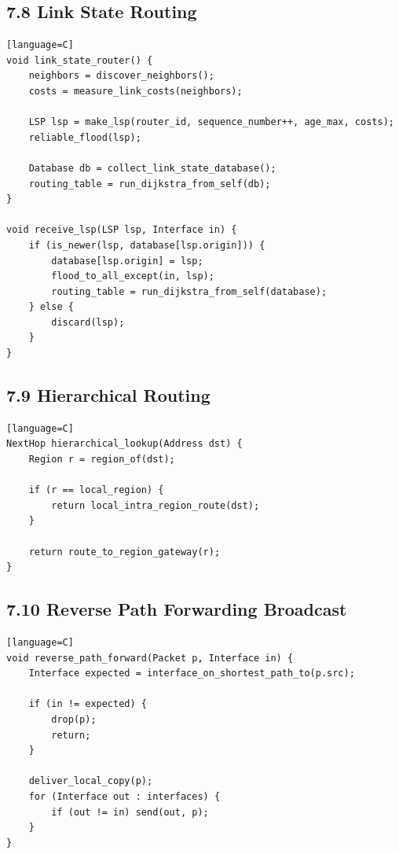 \documentclass[11pt]{article}
\begin{document}
\subsection{7.8 Link State Routing}\label{link-state-routing}

\begin{verbatim}[language=C]
void link_state_router() {
    neighbors = discover_neighbors();
    costs = measure_link_costs(neighbors);

    LSP lsp = make_lsp(router_id, sequence_number++, age_max, costs);
    reliable_flood(lsp);

    Database db = collect_link_state_database();
    routing_table = run_dijkstra_from_self(db);
}

void receive_lsp(LSP lsp, Interface in) {
    if (is_newer(lsp, database[lsp.origin])) {
        database[lsp.origin] = lsp;
        flood_to_all_except(in, lsp);
        routing_table = run_dijkstra_from_self(database);
    } else {
        discard(lsp);
    }
}
\end{verbatim}

\subsection{7.9 Hierarchical Routing}\label{hierarchical-routing}

\begin{verbatim}[language=C]
NextHop hierarchical_lookup(Address dst) {
    Region r = region_of(dst);

    if (r == local_region) {
        return local_intra_region_route(dst);
    }

    return route_to_region_gateway(r);
}
\end{verbatim}

\subsection{7.10 Reverse Path Forwarding
Broadcast}\label{reverse-path-forwarding-broadcast}

\begin{verbatim}[language=C]
void reverse_path_forward(Packet p, Interface in) {
    Interface expected = interface_on_shortest_path_to(p.src);

    if (in != expected) {
        drop(p);
        return;
    }

    deliver_local_copy(p);
    for (Interface out : interfaces) {
        if (out != in) send(out, p);
    }
}
\end{verbatim}
\end{document}
